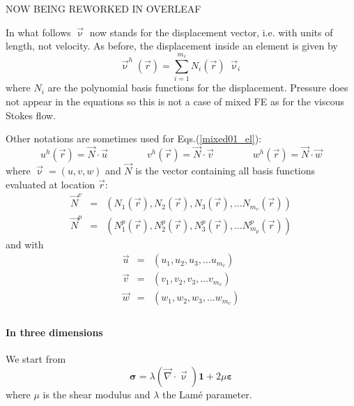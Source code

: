 
NOW BEING REWORKED IN OVERLEAF

In what follows $\vec\upnu$ now stands for the displacement vector, i.e. 
with units of length, not velocity. 
As before, the displacement inside an element is given by 
\begin{equation}
{\vec \upnu}^h({\vec r})=\sum_{i=1}^{m_v} N_i({\vec r})\;  {\vec \upnu}_i
\label{mixed01_el}
\end{equation}
where $N_i$ are the polynomial basis functions for the displacement.
Pressure does not appear in the equations so this is not a case of 
mixed FE as for the viscous Stokes flow. 

Other notations are sometimes used for Eqs.(\ref{mixed01_el}):
\begin{equation}
u^h({\vec r}) = \vec{N} \cdot \vec{u}
\quad\quad\quad\quad
v^h({\vec r}) = \vec{N} \cdot \vec{v}
\quad\quad\quad\quad
w^h({\vec r}) = \vec{N} \cdot \vec{w}
\end{equation} 
where ${\vec \upnu}=(u,v,w)$ and $\vec{N}$ 
is the vector containing all basis functions evaluated at location ${\vec r}$:
\begin{eqnarray}
\vec{N}^v &=& \left( N_1({\vec r}),  N_2({\vec r}),  N_3({\vec r}), \dots  N_{m_v}({\vec r}) \right) \\
\vec{N}^p &=& \left( N_1^p({\vec r}),  N_2^p({\vec r}),  N_3^p({\vec r}), \dots  N_{m_p}^p({\vec r}) \right)
\end{eqnarray}
and with 
\begin{eqnarray}
\vec{u} &=& \left( u_1,  u_2,  u_3, \dots  u_{m_v} \right) \\
\vec{v} &=& \left( v_1,  v_2,  v_3, \dots  v_{m_v} \right) \\
\vec{w} &=& \left( w_1,  w_2,  w_3, \dots  w_{m_v} \right) \\
\end{eqnarray}

\paragraph{In three dimensions} We start from
\[
{\bm \sigma} = \lambda (\vec\nabla\cdot \vec\upnu) {\bm 1}+ 2\mu {\bm \varepsilon}
\]
where $\mu$ is the shear modulus and $\lambda$ the Lam{\'e} parameter.

